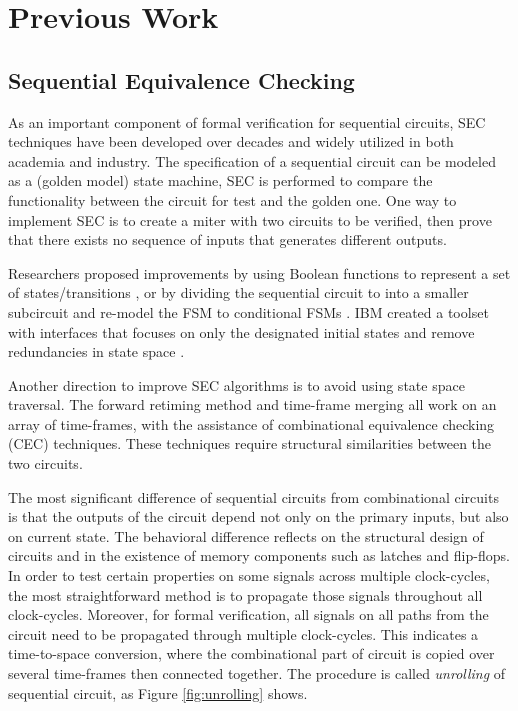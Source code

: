 \chapter{Previous Work}
\label{ch:prev}
\section{Sequential Equivalence Checking}
As an important component of formal verification for sequential circuits, SEC techniques 
have been developed over decades and widely utilized in both academia and industry. 
The specification of a sequential circuit can be modeled as a (golden model) state machine,
SEC is performed to compare the functionality between the circuit for test and the golden one.
One way to implement SEC is to create a miter with two circuits to be verified, then 
prove that there exists no sequence of inputs that generates different outputs.

Researchers proposed improvements by using Boolean functions to represent 
a set of states/transitions \cite{coudert2003unified, coudert1990verification},  or by dividing the sequential circuit to 
into a smaller subcircuit and re-model the FSM to conditional FSMs \cite{khasidashvili2004theoretical}. IBM created a toolset with 
interfaces that focuses on only the designated initial states and remove redundancies in state space \cite{baumgartner2007scalable}.

Another direction to improve SEC algorithms is to avoid using state space traversal. 
The forward retiming method \cite{van1998sequential} and time-frame merging \cite{stoffel1997record} 
all work on an array of time-frames,  with the assistance of combinational equivalence checking (CEC)
techniques. These techniques require structural similarities between the two circuits.

The most significant difference of sequential circuits from combinational circuits is 
that the outputs of the circuit depend not only 
on the primary inputs, but also on current state. 
The behavioral difference reflects on the structural design of circuits and in 
the existence of memory components such as latches and flip-flops.
In order to test certain properties on some signals across multiple clock-cycles,
the most straightforward method is to propagate those signals throughout 
all clock-cycles. Moreover, for formal verification, all signals on all paths from the circuit
need to be propagated through multiple clock-cycles.
This indicates a time-to-space conversion, where 
 the combinational part of circuit
is copied over several time-frames then connected together.
The procedure is called {\it unrolling} of sequential circuit, as 
Figure \ref{fig:unrolling} shows.

